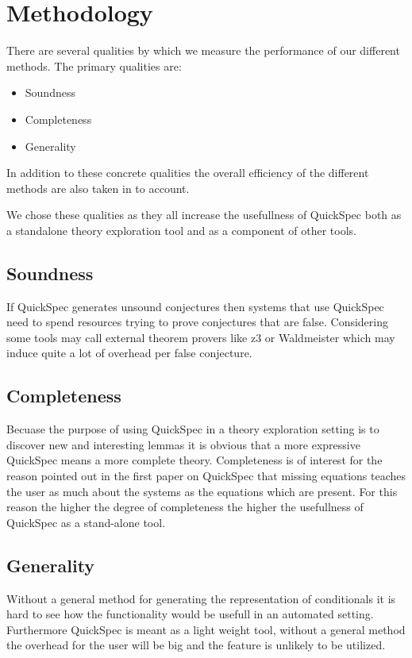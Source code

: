 \section{Methodology}
There are several qualities by which we measure the performance of our different methods.
The primary qualities are:

\begin{itemize}

    \item Soundness
    \item Completeness
    \item Generality

\end{itemize}

In addition to these concrete qualities the overall efficiency of the different methods are also
taken in to account.

We chose these qualities as they all increase the usefullness
of QuickSpec both as a standalone theory exploration tool
and as a component of other tools.

    \subsection{Soundness}
    If QuickSpec generates unsound conjectures then systems that use QuickSpec
    need to spend resources trying to prove conjectures that are false. 
    Considering some tools may call external theorem provers like z3 or Waldmeister %
    which may induce quite a lot of overhead per false conjecture.

    \subsection{Completeness}
    Becuase the purpose of using QuickSpec in a theory exploration setting is to discover
    new and interesting lemmas it is obvious that a more expressive QuickSpec means a more
    complete theory. %
    Completeness is of interest for the reason pointed out in the first paper on QuickSpec that %
    missing equations teaches the user as much about the systems as the equations which are
    present. For this reason the higher the degree of completeness the higher the usefullness
    of QuickSpec as a stand-alone tool. 

    \subsection{Generality}
    Without a general method for generating the representation of conditionals
    it is hard to see how the functionality would be usefull in an automated setting.
    Furthermore QuickSpec is meant as a light weight tool, without a general method
    the overhead for the user will be big and the feature is unlikely to be utilized.
